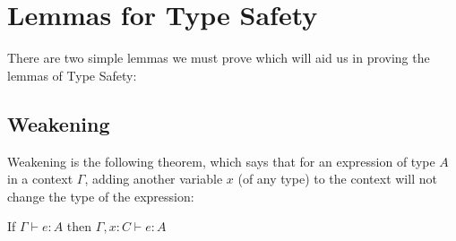 \section{Lemmas for Type Safety}
There are two simple lemmas we must prove which will aid us in proving the lemmas of Type Safety:


\subsection{Weakening}\label{weak} 
Weakening is the following theorem, which says that for an expression of type $A$ in a context $\Gamma$, adding another variable $x$ (of any type) to the context will not change the type of the expression:

\vspace{0.5cm}

\begin{thm}
If $\Gamma \vdash e:A$ then  $\Gamma,x:C \vdash e:A$ 
\end{thm}
 
